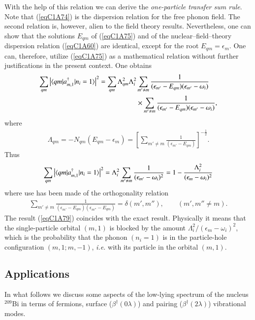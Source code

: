 With the help of this relation we can derive the\textit{ one-particle transfer sum rule}. Note that (\ref{eqC1A74}) is the dispersion relation for the free phonon field. The second relation is, however, alien to the field theory results. Nevertheless, one can show that the solutions $E_{qm}$ of (\ref{eqC1A75}) and of the nuclear--field--theory dispersion relation (\ref{eqC1A60}) are identical, except for the root $E_{qm}=\epsilon_m$. One can, therefore, utilize (\ref{eqC1A75}) as a mathematical relation without further justifications in the 
present context. One obtains 
  \begin{align}\label{eqC1A77} 
   \nonumber \sum_{qm}\left|\langle {qm|a^\dagger_{m,1}|n_i=1} \rangle\right|^2=\sum_{qm}\Lambda_{qm}^2\Lambda_i^2& \sum_{m'\neq m}\frac{1}{(\epsilon_{m'}-E_{qm})(\epsilon_{m'}-\omega_i)}\\
   &\times \sum_{m'\neq m}\frac{1}{(\epsilon_{m'}-E_{qm})(\epsilon_{m'}-\omega_i)},
    \end{align} 
where
  \begin{align}\label{eqC1A78} 
   \Lambda_{qm}=-N_{qm}(E_{qm}-\epsilon_m)=\left[\sum_{m'\neq m}\frac{1}{(\epsilon_{m'}-E_{qm})}\right]^{-\frac{1}{2}}.
    \end{align} 
    Thus
      \begin{align}\label{eqC1A79} 
 \sum_{qm}\left|\langle {qm|a^\dagger_{m,1}|n_i=1} \rangle\right|^2=\Lambda_i^2\sum_{m'\neq m}\frac{1}{(\epsilon_{m'}-\omega_i)^2}=1-\frac{\Lambda^2_i}{(\epsilon_m-\omega_i)^2}     
        \end{align} 
where use has been made of the orthogonality relation 
  \begin{align}\label{eqC1A80} 
\sum_{m'\neq m}\frac{1}{(\epsilon_{m'}-E_{qm})(\epsilon_{m''}-E_{qm})}=\delta(m',m''),\qquad (m',m''\neq m).
    \end{align}  
The result (\ref{eqC1A79}) coincides with the exact result. Physically it means that the single-particle orbital $(m, 1)$ is blocked by the amount $\Lambda_i^2/(\epsilon_m-\omega_i)^2$, which is the probability that the phonon $(n_i= 1)$ is in the particle-hole configuration $(m,1;m,-1)$, \textit{i.e.} with its particle in the orbital $(m,1)$. 
\subsection{Applications}\label{Sect1.7.4}
In what follows we discuss some aspects of the low-lying spectrum of the nucleus $^{209}$Bi in terms of fermions, surface ($\beta^\dagger(0\lambda)$) and pairing ($\beta^\dagger(2\lambda)$) vibrational modes. 

